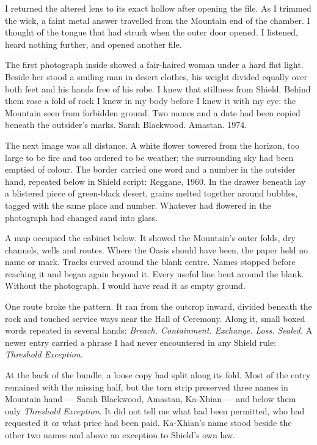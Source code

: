 I returned the altered lens to its exact hollow after opening the file. As I trimmed the wick, a faint metal answer travelled from the Mountain end of the chamber. I thought of the tongue that had struck when the outer door opened. I listened, heard nothing further, and opened another file.\par

The first photograph inside showed a fair-haired woman under a hard flat light. Beside her stood a smiling man in desert clothes, his weight divided equally over both feet and his hands free of his robe. I knew that stillness from Shield. Behind them rose a fold of rock I knew in my body before I knew it with my eye: the Mountain seen from forbidden ground. Two names and a date had been copied beneath the outsider's marks. Sarah Blackwood. Amastan. 1974.\par

The next image was all distance. A white flower towered from the horizon, too large to be fire and too ordered to be weather; the surrounding sky had been emptied of colour. The border carried one word and a number in the outsider hand, repeated below in Shield script: Reggane, 1960. In the drawer beneath lay a blistered piece of green-black desert, grains melted together around bubbles, tagged with the same place and number. Whatever had flowered in the photograph had changed sand into glass.\par

A map occupied the cabinet below. It showed the Mountain's outer folds, dry channels, wells and routes. Where the Oasis should have been, the paper held no name or mark. Tracks curved around the blank centre. Names stopped before reaching it and began again beyond it. Every useful line bent around the blank. Without the photograph, I would have read it as empty ground.\par

One route broke the pattern. It ran from the outcrop inward, divided beneath the rock and touched service ways near the Hall of Ceremony. Along it, small boxed words repeated in several hands: \textit{Breach. Containment. Exchange. Loss. Sealed.} A newer entry carried a phrase I had never encountered in any Shield rule: \textit{Threshold Exception.}\par

At the back of the bundle, a loose copy had split along its fold. Most of the entry remained with the missing half, but the torn strip preserved three names in Mountain hand --- Sarah Blackwood, Amastan, Ka-Xhian --- and below them only \textit{Threshold Exception}. It did not tell me what had been permitted, who had requested it or what price had been paid. Ka-Xhian's name stood beside the other two names and above an exception to Shield's own law.\par

